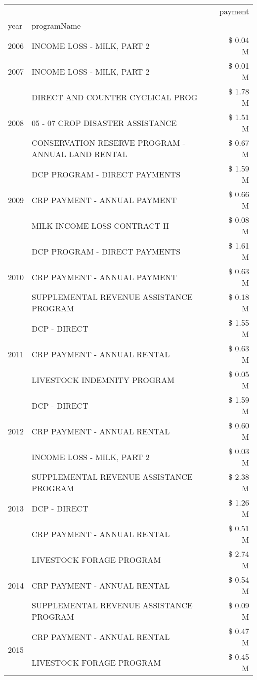 \begin{tabular}{llr}
\toprule
 &  & payment \\
year & programName &  \\
\midrule
2006 & INCOME LOSS - MILK, PART 2 & \$ 0.04 M \\
\cline{1-3}
2007 & INCOME LOSS - MILK, PART 2 & \$ 0.01 M \\
\cline{1-3}
\multirow[t]{3}{*}{2008} & DIRECT AND COUNTER CYCLICAL PROG & \$ 1.78 M \\
 & 05 - 07 CROP DISASTER ASSISTANCE & \$ 1.51 M \\
 & CONSERVATION RESERVE PROGRAM - ANNUAL LAND RENTAL & \$ 0.67 M \\
\cline{1-3}
\multirow[t]{3}{*}{2009} & DCP PROGRAM - DIRECT PAYMENTS & \$ 1.59 M \\
 & CRP PAYMENT - ANNUAL PAYMENT & \$ 0.66 M \\
 & MILK INCOME LOSS CONTRACT II & \$ 0.08 M \\
\cline{1-3}
\multirow[t]{3}{*}{2010} & DCP PROGRAM - DIRECT PAYMENTS & \$ 1.61 M \\
 & CRP PAYMENT - ANNUAL PAYMENT & \$ 0.63 M \\
 & SUPPLEMENTAL REVENUE ASSISTANCE PROGRAM & \$ 0.18 M \\
\cline{1-3}
\multirow[t]{3}{*}{2011} & DCP - DIRECT & \$ 1.55 M \\
 & CRP PAYMENT - ANNUAL RENTAL & \$ 0.63 M \\
 & LIVESTOCK INDEMNITY PROGRAM & \$ 0.05 M \\
\cline{1-3}
\multirow[t]{3}{*}{2012} & DCP - DIRECT & \$ 1.59 M \\
 & CRP PAYMENT - ANNUAL RENTAL & \$ 0.60 M \\
 & INCOME LOSS - MILK, PART 2 & \$ 0.03 M \\
\cline{1-3}
\multirow[t]{3}{*}{2013} & SUPPLEMENTAL REVENUE ASSISTANCE PROGRAM & \$ 2.38 M \\
 & DCP - DIRECT & \$ 1.26 M \\
 & CRP PAYMENT - ANNUAL RENTAL & \$ 0.51 M \\
\cline{1-3}
\multirow[t]{3}{*}{2014} & LIVESTOCK FORAGE PROGRAM & \$ 2.74 M \\
 & CRP PAYMENT - ANNUAL RENTAL & \$ 0.54 M \\
 & SUPPLEMENTAL REVENUE ASSISTANCE PROGRAM & \$ 0.09 M \\
\cline{1-3}
\multirow[t]{3}{*}{2015} & CRP PAYMENT - ANNUAL RENTAL & \$ 0.47 M \\
 & LIVESTOCK FORAGE PROGRAM & \$ 0.45 M \\

\end{tabular}
